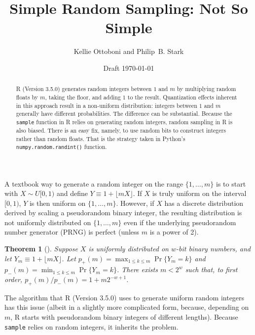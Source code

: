 \documentclass[12pt]{article}
\title{Simple Random Sampling: Not So Simple}
\author{Kellie Ottoboni and Philip~B. Stark}
\date{Draft \today}
\newtheorem{theorem}{Theorem}[section]
\begin{document}
\maketitle


\begin{abstract}
R (Version 3.5.0) generates random integers between $1$ and $m$
by multiplying random floats by $m$, taking the floor, and adding $1$ to the result.
Quantization effects inherent in this approach result in a non-uniform distribution: 
integers between $1$ and $m$ generally have different probabilities.
The difference can be substantial.
Because the \texttt{sample} function in R relies on generating random integers,
random sampling in R is also biased.
There is an easy fix, namely, to use random bits to construct integers rather than random floats.
That is the strategy taken in Python's \texttt{numpy.random.randint()} function.
\end{abstract}



A textbook way to generate a random integer on the range $\{1, \dots, m\}$ is to start with $X \sim U[0,1)$ and define $Y \equiv 1 + \lfloor mX \rfloor$. 
If $X$ is truly uniform on the interval $[0,1)$, $Y$ is then uniform on $\{1, \dots, m\}$.
However, if $X$ has a discrete distribution derived by scaling a pseudorandom binary integer, 
the resulting distribution is not uniformly distributed on 
$\{1, \ldots, m \}$ even if the underlying pseudorandom number generator (PRNG) is perfect (unless $m$ is a power of 2).

\begin{theorem}[\citet{knuth_art_1997}] %
Suppose $X$ is uniformly distributed on $w$-bit binary numbers, and
let $Y_m \equiv 1 + \lfloor mX \rfloor$.
Let $p_+(m) = \max_{1 \le k \le m} \Pr\{Y_m = k\}$ and $p_-(m) = \min_{1 \le k \le m} \Pr\{Y_m = k\}$.
There exists $m < 2^w$ such that, to first order, 
$p_+(m)/p_-(m) = 1 + m2^{-w+1}$.
\end{theorem}

The algorithm that R (Version 3.5.0) \citep{R_2018} uses to generate uniform random integers
has this issue (albeit in a slightly more complicated form, because, depending on $m$,
R starts with pseudorandom binary integers of different lengths). 
Because \texttt{sample} relies on random integers, it inherits the problem.
\end{document}
